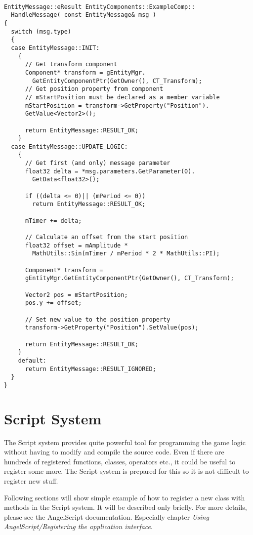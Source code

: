 \documentclass[a4paper, 12pt]{report}
\begin{document}
\begin{verbatim}

EntityMessage::eResult EntityComponents::ExampleComp::
  HandleMessage( const EntityMessage& msg )
{
  switch (msg.type)
  {
  case EntityMessage::INIT:
    {
      // Get transform component
      Component* transform = gEntityMgr.
        GetEntityComponentPtr(GetOwner(), CT_Transform);
      // Get position property from component
      // mStartPosition must be declared as a member variable
      mStartPosition = transform->GetProperty("Position").
      GetValue<Vector2>();

      return EntityMessage::RESULT_OK;
    }
  case EntityMessage::UPDATE_LOGIC:
    {
      // Get first (and only) message parameter
      float32 delta = *msg.parameters.GetParameter(0).
        GetData<float32>();

      if ((delta <= 0)|| (mPeriod <= 0))
        return EntityMessage::RESULT_OK;

      mTimer += delta;

      // Calculate an offset from the start position
      float32 offset = mAmplitude * 
        MathUtils::Sin(mTimer / mPeriod * 2 * MathUtils::PI);

      Component* transform = 
      gEntityMgr.GetEntityComponentPtr(GetOwner(), CT_Transform);

      Vector2 pos = mStartPosition;
      pos.y += offset;

      // Set new value to the position property
      transform->GetProperty("Position").SetValue(pos);

      return EntityMessage::RESULT_OK;
    }
    default:
      return EntityMessage::RESULT_IGNORED;
  }
}
\end{verbatim}

\chapter{Script System}

The Script system provides quite powerful tool for programming the game logic without having to modify and compile the source code. Even if there are hundreds of registered functions, classes, operators etc., it could be useful to register some more. The Script system is prepared for this so it is not difficult to register new stuff.

Following sections will show simple example of how to register a new class with methods in the Script system. It will be described only briefly. For more details, please see the AngelScript documentation. Especially chapter \emph{Using AngelScript/Registering the application interface}.
\end{document}
